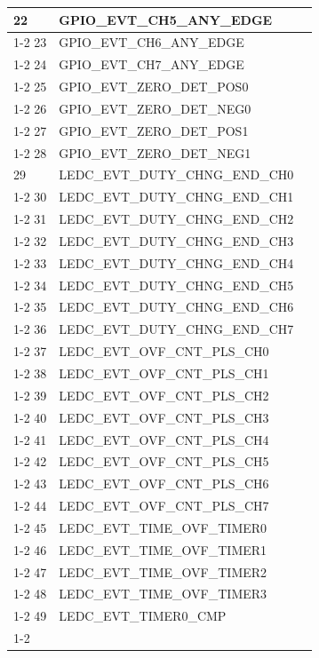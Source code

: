 \documentclass[main\_\_EN.tex]{subfiles}
\begin{document}
\begin{longtable}{ | l | l | l | }
22  & GPIO\_EVT\_CH5\_ANY\_EDGE &  \\ \cline{1-2}
23  & GPIO\_EVT\_CH6\_ANY\_EDGE &  \\ \cline{1-2}
24  & GPIO\_EVT\_CH7\_ANY\_EDGE &  \\ \cline{1-2}
25  & GPIO\_EVT\_ZERO\_DET\_POS0 &  \\ \cline{1-2}
26  & GPIO\_EVT\_ZERO\_DET\_NEG0 &  \\ \cline{1-2}
27  & GPIO\_EVT\_ZERO\_DET\_POS1 &  \\ \cline{1-2}
28  & GPIO\_EVT\_ZERO\_DET\_NEG1 &  \\ \hline
29  & LEDC\_EVT\_DUTY\_CHNG\_END\_CH0  & \nameref{mod:ledpwm}\\ \cline{1-2}
30  & LEDC\_EVT\_DUTY\_CHNG\_END\_CH1  & \\ \cline{1-2}
31  & LEDC\_EVT\_DUTY\_CHNG\_END\_CH2  & \\ \cline{1-2}
32  & LEDC\_EVT\_DUTY\_CHNG\_END\_CH3  & \\ \cline{1-2}
33  & LEDC\_EVT\_DUTY\_CHNG\_END\_CH4  & \\ \cline{1-2}
34  & LEDC\_EVT\_DUTY\_CHNG\_END\_CH5  & \\ \cline{1-2}
35  & LEDC\_EVT\_DUTY\_CHNG\_END\_CH6  & \\ \cline{1-2}
36  & LEDC\_EVT\_DUTY\_CHNG\_END\_CH7  & \\ \cline{1-2}
37  & LEDC\_EVT\_OVF\_CNT\_PLS\_CH0    & \\ \cline{1-2}
38  & LEDC\_EVT\_OVF\_CNT\_PLS\_CH1    & \\ \cline{1-2}
39  & LEDC\_EVT\_OVF\_CNT\_PLS\_CH2    & \\ \cline{1-2}
40  & LEDC\_EVT\_OVF\_CNT\_PLS\_CH3    & \\ \cline{1-2}
41  & LEDC\_EVT\_OVF\_CNT\_PLS\_CH4    & \\ \cline{1-2}
42  & LEDC\_EVT\_OVF\_CNT\_PLS\_CH5    & \\ \cline{1-2}
43  & LEDC\_EVT\_OVF\_CNT\_PLS\_CH6    & \\ \cline{1-2}
44  & LEDC\_EVT\_OVF\_CNT\_PLS\_CH7    & \\ \cline{1-2}
45  & LEDC\_EVT\_TIME\_OVF\_TIMER0     & \\ \cline{1-2}
46  & LEDC\_EVT\_TIME\_OVF\_TIMER1     & \\ \cline{1-2}
47  & LEDC\_EVT\_TIME\_OVF\_TIMER2     & \\ \cline{1-2}
48  & LEDC\_EVT\_TIME\_OVF\_TIMER3     & \\ \cline{1-2}
49  & LEDC\_EVT\_TIMER0\_CMP    & \\ \cline{1-2}

\end{longtable}
\end{document}
